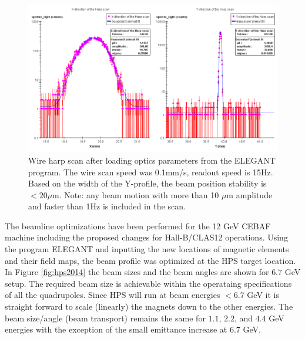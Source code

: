 \begin{figure}[t]
\includegraphics[scale=0.45]{beamline/harp_02.pdf}
\caption{\small{Wire harp scan after loading optics parameters from the ELEGANT program. The wire scan speed was 0.1mm/s, 
readout speed is 15Hz. Based on the width of the Y-profile, the beam position stability is  $< 20 \mu$m. Note: any beam motion with more 
than 10 $\mu$m amplitude and faster than 1Hz is included in the scan.}}\label{fig:profile_test}
\end{figure}
 
The beamline optimizations have been performed for the 12 GeV CEBAF machine including the proposed changes for Hall-B/CLAS12 operations. 
Using the program ELEGANT and inputting the new locations of magnetic elements and their field maps, the beam profile was optimized at the HPS 
target location. In Figure \ref{fig:hps2014} the beam sizes and the beam angles are shown for $6.7$ GeV setup.  The required beam 
size is achievable within the operataing specifications of all the quadrupoles.  Since HPS will run at beam energies $<6.7$ GeV it is straight 
forward to scale (linearly) the magnets down to the other energies.  The beam size/angle (beam transport) remains the same 
for $1.1$, $2.2$, and $4.4$ GeV energies with the exception of the small emittance increase at $6.7$ GeV.
  
